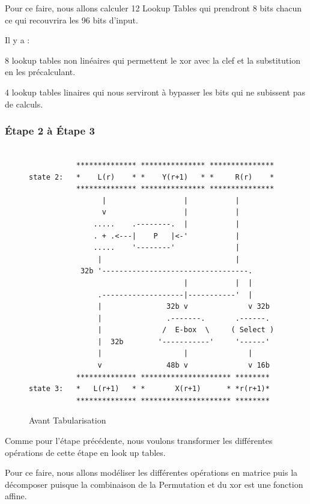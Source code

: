 \documentclass[a4paper,12pt]{article}
\begin{document}
\clearpage		
		
Pour ce faire, nous allons calculer 12 Lookup Tables qui prendront 8 bits chacun ce qui recouvrira les 96 bits d'input.

Il y a :

8 lookup tables non linéaires qui permettent le xor avec la clef et la substitution en les précalculant.


4 lookup tables linaires qui nous serviront à bypasser les bits qui ne subissent pas de calculs.		
		
\subsubsection{Étape 2 à Étape 3}

\begin{figure}[h]
\begin{verbatim}

           ************** *************** ***************
state 2:   *    L(r)    * *    Y(r+1)   * *     R(r)    *
           ************** *************** ***************
                 |                  |           |
                 v                  |           |
               .....    .--------.  |           |
               . + .<---|    P   |<-'           |
               .....    '--------'              |
                |                               |
            32b '----------------------------------.
                                    |           |  |
                .-------------------|-----------'  |
                |               32b v              v 32b
                |               .-------.       .------.
                |              /  E-box  \     ( Select )
                |  32b        '-----------'     '------'
                |                   |              |
                v               48b v              v 16b
           ************** ********************* ********
state 3:   *   L(r+1)   * *       X(r+1)      * *r(r+1)*
           ************** ********************* ********

\end{verbatim}
\caption{Avant Tabularisation}
\label{fig:ascii-box}
\end{figure}	

\newpage

Comme pour l'étape précédente, nous voulons transformer les différentes opérations de cette étape en look up tables.

Pour ce faire, nous allons modéliser les différentes opérations en matrice puis la décomposer puisque la combinaison de la Permutation et du xor est une fonction affine.
\end{document}
